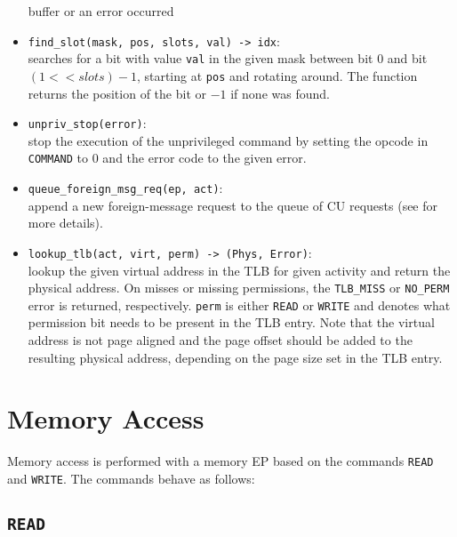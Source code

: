 \begin{itemize}
  buffer or an error occurred
  \item \texttt{find\_slot(mask, pos, slots, val) -> idx}:\\
  searches for a bit with value \texttt{val} in the given mask between bit 0 and bit $(1 << slots) -
  1$, starting at \texttt{pos} and rotating around. The function returns the position of the bit or
  $-1$ if none was found.
  \item \texttt{unpriv\_stop(error)}:\\
  stop the execution of the unprivileged command by setting the opcode in \texttt{COMMAND} to 0 and
  the error code to the given error.
  \item \texttt{queue\_foreign\_msg\_req(ep, act)}:\\
  append a new foreign-message request to the queue of CU requests (see
   for more details).\extend{}
  \item \texttt{lookup\_tlb(\colorbox{tilemux}{act, }virt, perm) -> (Phys, Error)}:\\
  lookup the given virtual address in the TLB \colorbox{tilemux}{for given activity} and return the
  physical address. On misses or missing permissions, the \texttt{TLB\_MISS} or \texttt{NO\_PERM}
  error is returned, respectively. \texttt{perm} is either \texttt{READ} or \texttt{WRITE} and denotes what permission bit needs to be present in the TLB entry. Note that the virtual address is not page aligned and the page
  offset should be added to the resulting physical address, depending on the page size set in the
  TLB entry.\extend{}
\end{itemize}

\section{Memory Access}

Memory access is performed with a memory EP based on the commands \texttt{READ} and \texttt{WRITE}.
The commands behave as follows:

\subsection{\texttt{READ}}

